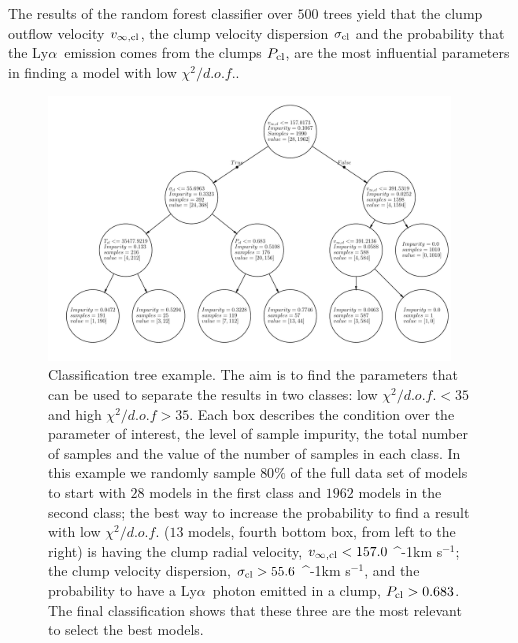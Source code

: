\documentclass[a4paper,fleqn,usenatbib]{mnras}
\newcommand{\lya}{\ifmmode{{\rm Ly}\alpha}\else Ly$\alpha$\ \fi}
\newcommand{\kms}{\ifmmode\mathrm{km\ s}^{-1}\else km s$^{-1}$\fi}
\begin{document}
The results of the random forest classifier over $500$ trees yield
that the clump outflow velocity $v_{\infty,\rm{cl}}$, the clump
velocity dispersion $\sigma_{\rm cl}$ and the probability that the
\lya emission comes from the clumps $P_{\rm cl}$, are the most
influential parameters in finding a model with low $\chi^2/d.o.f.$.  


\begin{figure}
\begin{center}
\includegraphics[width=0.95\textwidth]{classification_tree.pdf}
\caption{Classification tree example. 
The aim is to find the parameters that can be used to separate the
results in two classes: low $\chi^2/d.o.f. < 35$ and high $\chi^2/d.o.f>35$. 
Each box describes the condition over the parameter of interest, the
level of sample impurity, the total number of samples and the value of the
number of samples in each class.  
In this example we randomly sample $80\%$ of the full data set of models to
start with $28$ models in the first class and
$1962$ models in the second class; the best way to increase the
probability to find a result with low $\chi^2/d.o.f.$ ($13$ models,
fourth bottom box, from left to the right)
is having the clump radial velocity, $v_{\infty,{\rm cl}}<157.0$ \kms;
the clump velocity dispersion, $\sigma_{{\rm cl}}>55.6$ \kms, and the
probability to have a \lya photon emitted in a clump, $P_{\rm cl}>0.683$.
The final classification shows that these three are the most relevant
to select the best models.
\label{fig:tree}}
\end{center}
\end{figure}
\end{document}
